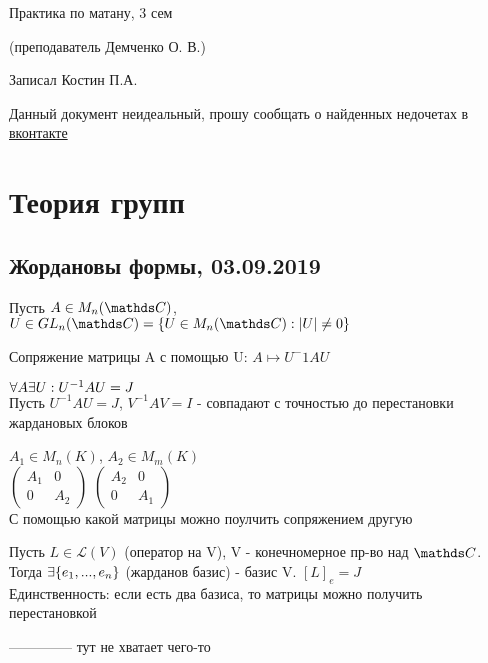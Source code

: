 \documentclass[12pt, fleqn]{article}
\begin{document}
\begin{center}
  \huge Практика по матану, 3 сем

  \Large (преподаватель Демченко О. В.)

  \large Записал Костин П.А.
\end{center}

Данный документ неидеальный, прошу сообщать о найденных недочетах в \href{https://vk.com/drab_existence_a}{вконтакте}
\tableofcontents
\newpage

\section{Теория групп}
\subsection{Жордановы формы, 03.09.2019}

\begin{utv}
    Пусть $A \in M_n(\CC)$, $U \in GL_n(\CC)=\{U \in M_n(\CC): |U| \neq 0\}$

    Сопряжение матрицы A с помощью U: $A \longmapsto U^-1 A U$
\end{utv}

\begin{theorem}
    $\forall A \exists U: U^{-1} A U = J$\\
    Пусть $U^{-1} A U = J$, $V^{-1} A V = I$ - совпадают с точностью до перестановки жардановых блоков
\end{theorem}

\begin{example}
    $A_1 \in M_n(K)$, $A_2 \in M_m(K)$\\
    $\begin{pmatrix}
      A_1 & 0\\
      0 & A_2
    \end{pmatrix}$
    $\begin{pmatrix}
      A_2 & 0\\
      0 & A_1
    \end{pmatrix}$\\
    С помощью какой матрицы можно поулчить сопряжением другую
\end{example}

\begin{theorem}
    Пусть $L \in \mathscr{L}(V)$ (оператор на V), V - конечномерное пр-во над $\CC$. Тогда $\exists \{e_1,...,e_n\}$ (жарданов базис) - базис V. $[L]_e=J$\\
    Единственность: если есть два базиса, то матрицы можно получить перестановкой
\end{theorem}
-------------- тут не хватает чего-то
\end{document}
